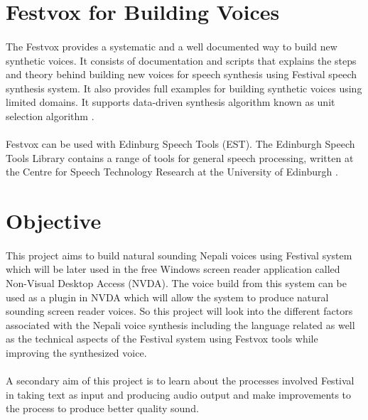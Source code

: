 \documentclass{report}
\begin{document}
		\section{Festvox for Building Voices}
		\paragraph{}
			The Festvox provides a systematic and a well documented way to build new synthetic voices. It consists of documentation and scripts that explains the steps and theory behind building new voices for speech synthesis using Festival speech synthesis system. It also provides full examples for building synthetic voices using limited domains. It supports data-driven synthesis algorithm known as unit selection algorithm  \cite{UNITSEL:4}. 
		\paragraph{}
	Festvox can be used with Edinburg Speech Tools (EST). The Edinburgh Speech Tools Library contains a range of tools for general speech processing, written at the Centre for Speech Technology Research at the University of Edinburgh \cite{FESTVOX:3}.

		\section{Objective}
		\paragraph{}
			This project aims to build natural sounding Nepali voices using Festival system which will be later used in the free Windows screen reader application called Non-Visual Desktop Access (NVDA). The voice build from this system can be used as a plugin in NVDA which will allow the system to produce natural sounding screen reader voices. So this project will look into the different factors associated with the Nepali voice synthesis including the language related as well as the technical aspects of the Festival system using Festvox tools while improving the synthesized voice.
		\paragraph{}
			A secondary aim of this project is to learn about the processes involved Festival in taking text as input and producing audio output and make improvements to the process to produce better quality sound.
\end{document}
